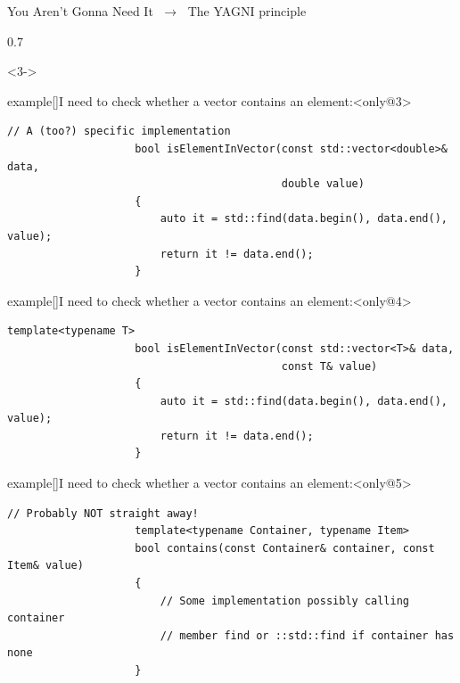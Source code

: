 \begin{frame}[fragile,t]{You Aren't Gonna Need It $\;\to\;$ The YAGNI principle}
\begin{overlayarea}{\textwidth}{0.7\textheight}
        \vspace{-1mm}
        \begin{onlyenv}<3->
            \begin{varblock}{example}[\textwidth]{I need to check whether a vector contains an element:}<only@3>
                \begin{lstlisting}[style=MyCpp]
                    // A (too?) specific implementation
                    bool isElementInVector(const std::vector<double>& data,
                                           double value)
                    {
                        auto it = std::find(data.begin(), data.end(), value);
                        return it != data.end();
                    }
                \end{lstlisting}
            \end{varblock}
            \begin{varblock}{example}[\textwidth]{I need to check whether a vector contains an element:}<only@4>
                \begin{lstlisting}[style=MyCpp]
                    template<typename T>
                    bool isElementInVector(const std::vector<T>& data,
                                           const T& value)
                    {
                        auto it = std::find(data.begin(), data.end(), value);
                        return it != data.end();
                    }
                \end{lstlisting}
            \end{varblock}
            \begin{varblock}{example}[\textwidth]{I need to check whether a vector contains an element:}<only@5>
                \begin{lstlisting}[style=MyCpp]
                    // Probably NOT straight away!
                    template<typename Container, typename Item>
                    bool contains(const Container& container, const Item& value)
                    {
                        // Some implementation possibly calling container
                        // member find or ::std::find if container has none
                    }
                \end{lstlisting}
            \end{varblock}
        \end{onlyenv}
    \end{overlayarea}
\end{frame}

